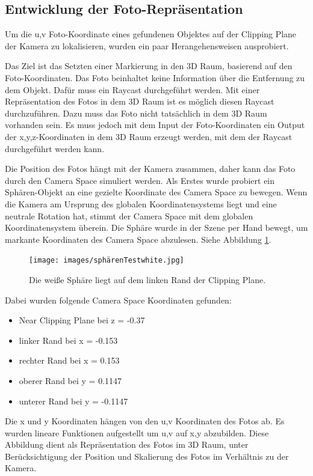 \subsection{Entwicklung der Foto-Repräsentation}
\label{section:devpixeltoworld}

Um die u,v Foto-Koordinate eines gefundenen Objektes auf der Clipping Plane der Kamera zu lokalisieren, wurden ein paar Herangehensweisen ausprobiert. 

Das Ziel ist das Setzten einer Markierung in den 3D Raum, basierend auf den Foto-Koordinaten. Das Foto beinhaltet keine Information über die Entfernung zu dem Objekt. Dafür muss ein Raycast durchgeführt werden. Mit einer Repräsentation des Fotos in dem 3D Raum ist es möglich diesen Raycast durchzuführen. Dazu muss das Foto nicht tatsächlich in dem 3D Raum vorhanden sein. Es muss jedoch mit dem Input der Foto-Koordinaten ein Output der x,y,z-Koordinaten in dem 3D Raum erzeugt werden, mit dem der Raycast durchgeführt werden kann.

Die Position des Fotos hängt mit der Kamera zusammen, daher kann das Foto durch den Camera Space simuliert werden. Als Erstes wurde probiert ein Sphären-Objekt an eine gezielte Koordinate des Camera Space zu bewegen. Wenn die Kamera am Ursprung des globalen Koordinatensystems liegt und eine neutrale Rotation hat, stimmt der Camera Space mit dem globalen Koordinatensystem überein. Die Sphäre wurde in der Szene per Hand bewegt, um markante Koordinaten des Camera Space abzulesen. Siehe Abbildung \ref{illustration:speretest}.

\begin{figure}[H]
	\centering
	\texttt{[image: images/sphärenTestwhite.jpg]}
	\caption[Ränder der Near Clipping Plane in Unity finden]{Die weiße Sphäre liegt auf dem linken Rand der Clipping Plane.}
	\label{illustration:speretest}
\end{figure}

Dabei wurden folgende Camera Space Koordinaten gefunden:
\begin{itemize}
	\item Near Clipping Plane bei z = -0.37
	\item linker Rand bei x = -0.153
	\item rechter Rand bei x = 0.153
	\item oberer Rand bei y = 0.1147
	\item unterer Rand bei y = -0.1147
\end{itemize}

Die x und y Koordinaten hängen von den u,v Koordinaten des Fotos ab. Es wurden lineare Funktionen aufgestellt um u,v auf x,y abzubilden. Diese Abbildung dient als Repräsentation des Fotos im 3D Raum, unter Berücksichtigung der Position und Skalierung des Fotos im Verhältnis zu der Kamera.

